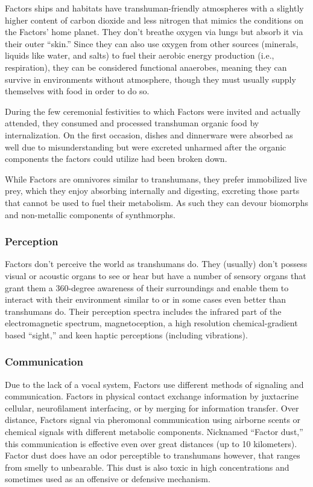 Factors ships and habitats have transhuman-friendly 
atmospheres with a slightly higher content of carbon 
dioxide and less nitrogen that mimics the conditions 
on the Factors' home planet. They don't breathe 
oxygen via lungs but absorb it via their outer ``skin.'' 
Since they can also use oxygen from other sources 
(minerals, liquids like water, and salts) to fuel their 
aerobic energy production (i.e., respiration), they can 
be considered functional anaerobes, meaning they can 
survive in environments without atmosphere, though 
they must usually supply themselves with food in 
order to do so.

During the few ceremonial festivities to which 
Factors were invited and actually attended, they 
consumed and processed transhuman organic food 
by internalization. On the first occasion, dishes and 
dinnerware were absorbed as well due to misunderstanding
but were excreted unharmed after the organic
components the factors could utilize had been
broken down. 

While Factors are omnivores similar to transhumans, 
they prefer immobilized live prey, which they enjoy 
absorbing internally and digesting, excreting those 
parts that cannot be used to fuel their metabolism. 
As such they can devour biomorphs and non-metallic 
components of synthmorphs.

\subsubsection{Perception }

Factors don't perceive the world as transhumans 
do. They (usually) don't possess visual or acoustic 
organs to see or hear but have a number of sensory 
organs that grant them a 360-degree awareness of 
their surroundings and enable them to interact 
with their environment similar to or in some cases 
even better than transhumans do. Their perception 
spectra includes the infrared part of the electromagnetic
spectrum, magnetoception, a high resolution
chemical-gradient based ``sight,'' and keen haptic 
perceptions (including vibrations). 

\subsubsection{Communication }

Due to the lack of a vocal system, Factors use different 
methods of signaling and communication. Factors in 
physical contact exchange information by juxtacrine 
cellular, neurofilament interfacing, or by merging for 
information transfer. Over distance, Factors signal via 
pheromonal communication using airborne scents or 
chemical signals with different metabolic components. 
Nicknamed ``Factor dust,'' this communication is effective
even over great distances (up to 10 kilometers).
Factor dust does have an odor perceptible to transhumans
however, that ranges from smelly to unbearable.
This dust is also toxic in high concentrations and sometimes
used as an offensive or defensive mechanism.

